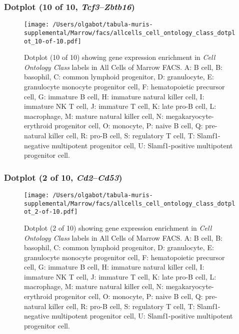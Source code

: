 \subsubsection{Dotplot (10 of 10, \emph{Tcf3}--\emph{Zbtb16})}
\begin{figure}[h]
\centering
\texttt{[image: /Users/olgabot/tabula-muris-supplemental/Marrow/facs/allcells\_cell\_ontology\_class\_dotplot\_10-of-10.pdf]}

\caption{ Dotplot (10 of 10)  showing gene expression enrichment in \emph{Cell Ontology Class} labels in All Cells of Marrow FACS. A: B cell, B: basophil, C: common lymphoid progenitor, D: granulocyte, E: granulocyte monocyte progenitor cell, F: hematopoietic precursor cell, G: immature B cell, H: immature natural killer cell, I: immature NK T cell, J: immature T cell, K: late pro-B cell, L: macrophage, M: mature natural killer cell, N: megakaryocyte-erythroid progenitor cell, O: monocyte, P: naive B cell, Q: pre-natural killer cell, R: pro-B cell, S: regulatory T cell, T: Slamf1-negative multipotent progenitor cell, U: Slamf1-positive multipotent progenitor cell.}
\end{figure}


\clearpage

\subsubsection{Dotplot (2 of 10, \emph{Cd2}--\emph{Cd53})}
\begin{figure}[h]
\centering
\texttt{[image: /Users/olgabot/tabula-muris-supplemental/Marrow/facs/allcells\_cell\_ontology\_class\_dotplot\_2-of-10.pdf]}

\caption{ Dotplot (2 of 10)  showing gene expression enrichment in \emph{Cell Ontology Class} labels in All Cells of Marrow FACS. A: B cell, B: basophil, C: common lymphoid progenitor, D: granulocyte, E: granulocyte monocyte progenitor cell, F: hematopoietic precursor cell, G: immature B cell, H: immature natural killer cell, I: immature NK T cell, J: immature T cell, K: late pro-B cell, L: macrophage, M: mature natural killer cell, N: megakaryocyte-erythroid progenitor cell, O: monocyte, P: naive B cell, Q: pre-natural killer cell, R: pro-B cell, S: regulatory T cell, T: Slamf1-negative multipotent progenitor cell, U: Slamf1-positive multipotent progenitor cell.}
\end{figure}


\clearpage

